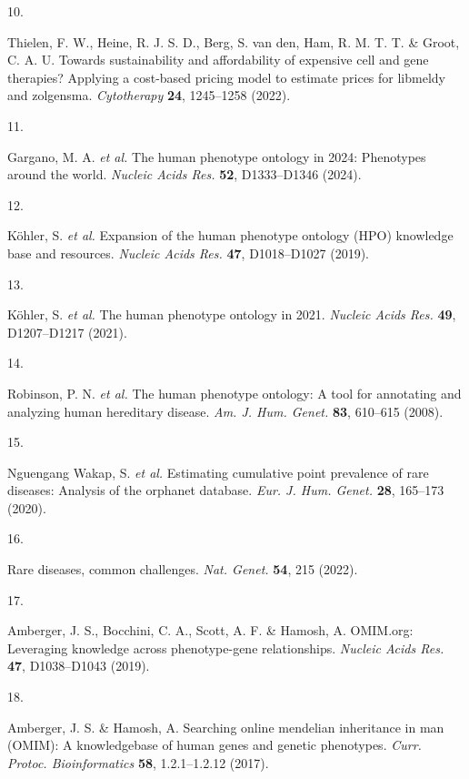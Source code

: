 \documentclass[
]{article}
\newlength{\cslhangindent}
\newlength{\csllabelwidth}
\newenvironment{CSLReferences}[2] %
 {\begin{list}{}{%
  \setlength{\itemindent}{0pt}
  \setlength{\leftmargin}{0pt}
  \setlength{\parsep}{0pt}
  \ifodd #1
   \setlength{\leftmargin}{\cslhangindent}
   \setlength{\itemindent}{-1\cslhangindent}
  \fi
  \setlength{\itemsep}{#2\baselineskip}}}
 {\end{list}}
\newcommand{\CSLLeftMargin}[1]{\parbox[t]{\csllabelwidth}{\strut#1\strut}}
\newcommand{\CSLRightInline}[1]{\parbox[t]{\linewidth - \csllabelwidth}{\strut#1\strut}}
\begin{document}
\begin{CSLReferences}{0}{0}
\CSLLeftMargin{10. }%
\CSLRightInline{Thielen, F. W., Heine, R. J. S. D., Berg, S. van den,
Ham, R. M. T. T. \& Groot, C. A. U. Towards sustainability and
affordability of expensive cell and gene therapies? Applying a
cost-based pricing model to estimate prices for libmeldy and zolgensma.
\emph{Cytotherapy} \textbf{24}, 1245--1258 (2022).}

\CSLLeftMargin{11. }%
\CSLRightInline{Gargano, M. A. \emph{et al.} The human phenotype
ontology in 2024: Phenotypes around the world. \emph{Nucleic Acids Res.}
\textbf{52}, D1333--D1346 (2024).}

\CSLLeftMargin{12. }%
\CSLRightInline{Köhler, S. \emph{et al.} Expansion of the human
phenotype ontology ({HPO}) knowledge base and resources. \emph{Nucleic
Acids Res.} \textbf{47}, D1018--D1027 (2019).}

\CSLLeftMargin{13. }%
\CSLRightInline{Köhler, S. \emph{et al.} The human phenotype ontology in
2021. \emph{Nucleic Acids Res.} \textbf{49}, D1207--D1217 (2021).}

\CSLLeftMargin{14. }%
\CSLRightInline{Robinson, P. N. \emph{et al.} The human phenotype
ontology: A tool for annotating and analyzing human hereditary disease.
\emph{Am. J. Hum. Genet.} \textbf{83}, 610--615 (2008).}

\CSLLeftMargin{15. }%
\CSLRightInline{Nguengang Wakap, S. \emph{et al.} Estimating cumulative
point prevalence of rare diseases: Analysis of the orphanet database.
\emph{Eur. J. Hum. Genet.} \textbf{28}, 165--173 (2020).}

\CSLLeftMargin{16. }%
\CSLRightInline{Rare diseases, common challenges. \emph{Nat. Genet.}
\textbf{54}, 215 (2022).}

\CSLLeftMargin{17. }%
\CSLRightInline{Amberger, J. S., Bocchini, C. A., Scott, A. F. \&
Hamosh, A. {OMIM.org}: Leveraging knowledge across phenotype-gene
relationships. \emph{Nucleic Acids Res.} \textbf{47}, D1038--D1043
(2019).}

\CSLLeftMargin{18. }%
\CSLRightInline{Amberger, J. S. \& Hamosh, A. Searching online mendelian
inheritance in man ({OMIM)}: A knowledgebase of human genes and genetic
phenotypes. \emph{Curr. Protoc. Bioinformatics} \textbf{58},
1.2.1--1.2.12 (2017).}


\end{CSLReferences}
\end{document}
